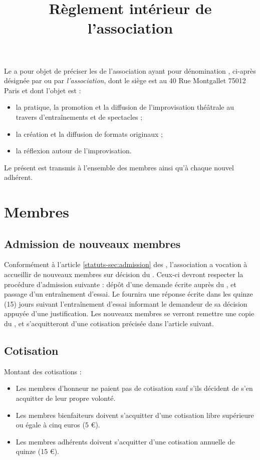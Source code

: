 \documentclass[a4paper,french,10pt]{article}
\title{Règlement intérieur de l'association \metae{}}
\newcommand{\article}[1]{\subsection{#1}\addtocounter{article}{1}}
\newcounter{article}
\newcommand{\artrefst}[1]{article \ref{statuts-#1} des \statuts{}}
\begin{document}
\date{}

\maketitle 
\pagestyle{fancy} 


\rhead{\thepage} 
\cfoot{} 


Le \RI{} a pour objet de préciser les \statuts{} de l'association ayant pour dénomination \textit{\metae{}}, ci-après désignée par \textit{\meta{}} ou par \textit{l'association}, dont le siège est au 40 Rue Montgallet 75012 Paris et dont l'objet est :
\begin{itemize}
\item la pratique, la promotion et la diffusion de l'improvisation théâtrale au travers d'entraînements et de spectacles ;
\item la création et la diffusion de formats originaux ;
\item la réflexion autour de l'improvisation.
\end{itemize}

Le présent \RI{} est transmis à l'ensemble des membres ainsi qu'à chaque nouvel adhérent.

\setcounter{article}{1}
\section{Membres}

\article{Admission de nouveaux membres}
\label{sec:admiss-de-nouv}

Conformément à l'\artrefst{sec:admission}, l'association \meta{} a vocation à accueillir de nouveaux membres sur décision du \bureau{}. Ceux-ci devront respecter la procédure d'admission suivante : dépôt d'une demande écrite auprès du \bureau{}, et passage d'un entraînement d'essai. Le \bureau{} fournira une réponse écrite dans les quinze (15) jours suivant l'entraînement d'essai informant le demandeur de sa décision appuyée d'une justification. Les nouveaux membres se verront remettre une copie du \RI{}, et s'acquitteront d'une cotisation précisée dans l'article suivant.

\article{Cotisation}
\label{sec:cotisation}
Montant des cotisations :

\begin{itemize}
\item Les membres d'honneur ne paient pas de cotisation sauf s'ils décident de s'en acquitter de leur propre volonté.
\item Les membres bienfaiteurs doivent s'acquitter d'une cotisation libre supérieure ou égale à cinq euros (5 \euro{}).
\item Les membres adhérents doivent s'acquitter d'une cotisation annuelle de quinze (15 \euro{}).
\end{itemize}
\end{document}
